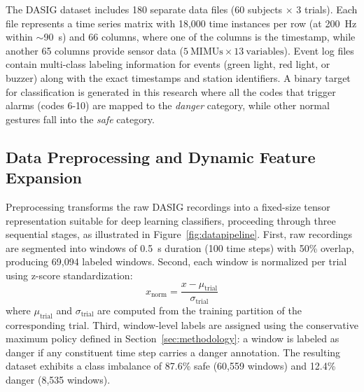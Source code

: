 \documentclass[3p,times,procedia]{elsarticle}
\begin{document}
The DASIG dataset includes 180 separate data files (60 subjects $\times$ 3 trials). Each file represents a time series matrix with 18,000 time instances per row (at 200~Hz within $\sim$90~s) and 66 columns, where one of the columns is the timestamp, while another 65 columns provide sensor data ($5~\text{MIMUs} \times 13~\text{variables}$). Event log files contain multi-class labeling information for events (green light, red light, or buzzer) along with the exact timestamps and station identifiers. A binary target for classification is generated in this research where all the codes that trigger alarms (codes 6-10) are mapped to the \textit{danger} category, while other normal gestures fall into the \textit{safe} category.

\subsection{Data Preprocessing and Dynamic Feature Expansion}

Preprocessing transforms the raw DASIG recordings into a fixed-size tensor representation suitable for deep learning classifiers, proceeding through three sequential stages, as illustrated in Figure~\ref{fig:datapipeline}. First, raw recordings are segmented into windows of 0.5~s duration (100 time steps) with 50\% overlap, producing 69,094 labeled windows. Second, each window is normalized per trial using z-score standardization:
\begin{equation}
    x_{\text{norm}} = \frac{x - \mu_{\text{trial}}}{\sigma_{\text{trial}}}
\end{equation}
where $\mu_{\text{trial}}$ and $\sigma_{\text{trial}}$ are computed from the training partition of the corresponding trial. Third, window-level labels are assigned using the conservative maximum policy defined in Section~\ref{sec:methodology}: a window is labeled as danger if any constituent time step carries a danger annotation. The resulting dataset exhibits a class imbalance of 87.6\% safe (60,559 windows) and 12.4\% danger (8,535 windows).
\end{document}
